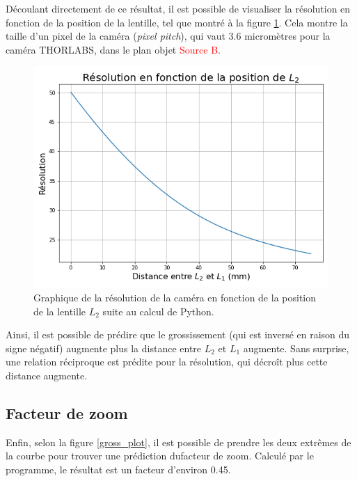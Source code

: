 \documentclass[11pt,letterpaper]{article}
\begin{document}
Découlant directement de ce résultat, il est possible de visualiser la résolution en fonction
de la position de la lentille, tel que montré à la figure \ref{res_plot}. Cela montre la taille
d'un pixel de la caméra (\textit{pixel pitch}), qui vaut 3.6 micromètres pour la caméra THORLABS, dans le plan objet \textcolor{red}{Source B}.


\begin{figure}[H]
  \centering
  \includegraphics[scale=0.55]{Resolution.png}
  \caption{Graphique de la résolution de la caméra en fonction de la position de la lentille
  $L_2$ suite au calcul de Python.}
  \label{res_plot}
\end{figure}

Ainsi, il est possible de prédire que le grossissement (qui est inversé en raison du signe 
négatif) augmente plus la distance entre $L_2$ et $L_1$ augmente. Sans surprise, une relation 
réciproque est prédite pour la résolution, qui décroît plus cette distance augmente.

\subsection{Facteur de zoom}

Enfin, selon la figure \ref{gross_plot}, il est possible de prendre les deux extrêmes de la courbe 
pour trouver une prédiction dufacteur de zoom. Calculé par le programme, le résultat est un facteur
d'environ 0.45.
\clearpage

% 
% 
\end{document}
